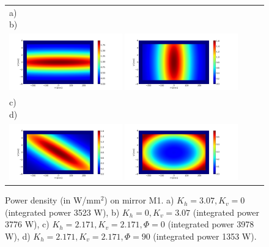 \documentclass[preprint]{iucr}              %
\begin{document}
\begin{figure} 
\label{fig:M1powerdensity}
\begin{center}
\begin{tabular}{l} 
   a)~~~~~~~~~~~~~~~~~~~~~~~~~~~~~~~~~~~~~~~~~~~~
   b)~~~~~~~~~~~~~~~~~~~~~~~~~~~~~~~~~~~~~~~~~~~~\\
   \includegraphics[width=0.45\textwidth]{figures/powerdensityKv.png}
   \includegraphics[width=0.45\textwidth]{figures/powerdensityKh.png}\\
   c)~~~~~~~~~~~~~~~~~~~~~~~~~~~~~~~~~~~~~~~~~~~~
   d)~~~~~~~~~~~~~~~~~~~~~~~~~~~~~~~~~~~~~~~~~~~~\\
   \includegraphics[width=0.45\textwidth]{figures/powerdensityKhKv.png} 
      \includegraphics[width=0.45\textwidth]{figures/powerdensityKhKv90.png}
\end{tabular}
\end{center}
\caption
{  Power density (in W/mm$^2$) on mirror M1.
a) $K_h=3.07, K_v=0$ (integrated power 3523 W),
b) $K_h=0,K_v=3.07$ (integrated power 3776 W),
c) $K_h=2.171,K_v=2.171, \Phi=0$ \textdegree (integrated power 3978 W),
d) $K_h=2.171,K_v=2.171, \Phi=90$ \textdegree (integrated power 1353 W).
}
\end{figure} 
\end{document}
